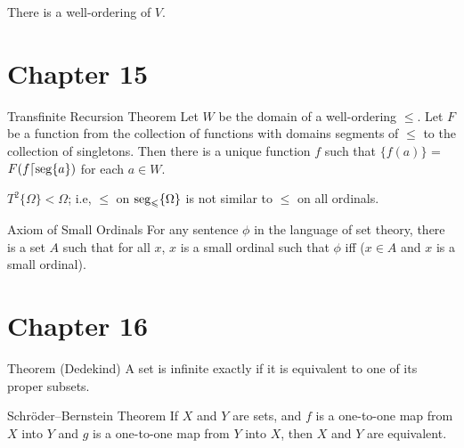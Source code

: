 \begin{thm}
 There is a well-ordering of $V$.
\end{thm}





\section *{Chapter 15}

\begin{Thm}{Transfinite Recursion Theorem}
 Let $W$ be the domain of a well-ordering
 $\leq$.  Let $F$ be a function from the collection of
 functions with domains segments of $\leq$ to the collection of
 singletons.  Then there is a unique function $f$ such that
 $\{f(a)\}$ = $F(f \lceil  \mathop{\mathrm{seg}}\{a\})$ for each $a \in W$.
\end{Thm}

\begin{thm}
 $T^2\{\Omega\} < \Omega$; i.e, $\leq$ on $\mathop{\mathrm{seg}}_{\leqslant}\{\Omega\}$ is not
 similar to $\leq$ on all\linebreak
 ordinals.
\end{thm}

\begin{axiom}{Axiom of Small Ordinals%
}
 For any sentence $\phi$ in the
 language of set theory, there is a set $A$ such that
 for all $x$, $x$ is a small ordinal such that $\phi$ iff ($x\in A$ and
 $x$ is a small ordinal).
\end{axiom}




\section *{Chapter 16}

\begin{Thm}{Theorem (Dedekind)}
 A set is infinite exactly if it is
 equivalent to 
 one of its proper subsets.
\end{Thm}

\begin{Thm}{Schr\"oder--Bernstein Theorem}
 If $X$ and $Y$ are sets, and $f$ is a 
 one-to-one map from $X$ into $Y$ and $g$ is a one-to-one
 map from $Y$ into $X$, 
 then $X$ and $Y$ are equivalent.
\end{Thm}





